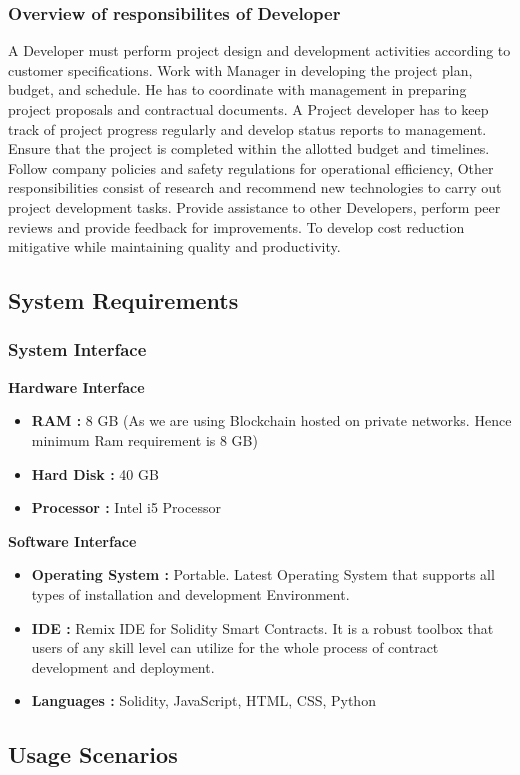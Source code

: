\documentclass[oneside, 12pt]{book}
\begin{document}
\subsubsection{Overview of responsibilites of Developer}
A Developer must perform project design and development activities according to customer specifications. Work with Manager in developing the project plan, budget, and schedule. He has to coordinate with management in preparing project proposals and contractual documents. A Project developer has to keep track of project progress regularly and develop status reports to management. Ensure that the project is completed within the allotted budget and timelines. Follow company policies and safety regulations for operational efficiency, Other responsibilities consist of research and recommend new technologies to carry out project development tasks. Provide assistance to other Developers, perform peer reviews and provide feedback for improvements. To develop cost reduction mitigative while maintaining quality and productivity.
\subsection{System Requirements}
\subsubsection{System Interface}
\textbf{Hardware Interface}
\begin{itemize}
	\item\textbf{RAM :} 8 GB (As we are using Blockchain hosted on private networks. Hence  minimum Ram requirement is 8 GB)
	\item\textbf{Hard Disk :} 40 GB
	\item\textbf{Processor :} Intel i5 Processor
\end{itemize}
\textbf{Software Interface}
\begin{itemize}
	\item\textbf{Operating System :} Portable. Latest Operating System that supports all types of installation and development Environment.
	\item\textbf{IDE :} Remix IDE for Solidity Smart Contracts. It is a robust toolbox that users of any skill level can utilize for the whole process of contract development and deployment.
	\item\textbf{Languages :} Solidity, JavaScript, HTML, CSS, Python
\end{itemize}
\subsection{Usage Scenarios}
\end{document}

